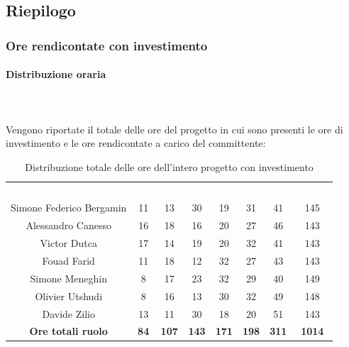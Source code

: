 \subsection{Riepilogo}
\subsubsection{Ore rendicontate con investimento}
\paragraph{Distribuzione oraria} \mbox{} \\ \mbox{} \\
Vengono riportate il totale delle ore del progetto in cui sono presenti le ore di investimento e le
ore rendicontate a carico del committente:

\begin{table}[H]
\centering\renewcommand{\arraystretch}{1.5}
\caption{Distribuzione totale delle ore dell'intero progetto con investimento}
\vspace{0.2cm}
\begin{tabular}{ c | c | c | c | c | c | c | c }
\rowcolor{redafk}
\textcolor{white}{\textbf{Nominativo}} & \textcolor{white}{\textbf{Re}} & 
\textcolor{white}{\textbf{Am}} & \textcolor{white}{\textbf{An}} &
\textcolor{white}{\textbf{Pt}} & \textcolor{white}{\textbf{Pm}} &
\textcolor{white}{\textbf{Ve}} & \textcolor{white}{\textbf{Totale}} \\
Simone Federico Bergamin 	& 11 	& 13 	& 30 	& 19 	& 31 	& 41 	& 145 \\
Alessandro Canesso 			& 16 	& 18 	& 16 	& 20 	& 27 	& 46 	& 143 \\
Victor Dutca 				& 17	& 14 	& 19 	& 20 	& 32 	& 41 	& 143 \\
Fouad Farid					& 11	& 18 	& 12 	& 32 	& 27 	& 43 	& 143 \\
Simone Meneghin 			& 8 	& 17 	& 23 	& 32 	& 29 	& 40 	& 149 \\
Olivier Utshudi 			& 8 	& 16 	& 13 	& 30 	& 32 	& 49 	& 148 \\
Davide Zilio 				& 13 	& 11 	& 30 	& 18 	& 20 	& 51 	& 143 \\
\rowcolor{lastrowcolor}
\textbf{Ore totali ruolo} & \textbf{84} & \textbf{107} & \textbf{143} & \textbf{171} & \textbf{198} & \textbf{311} & \textbf{1014} \\
\end{tabular}
\end{table}

